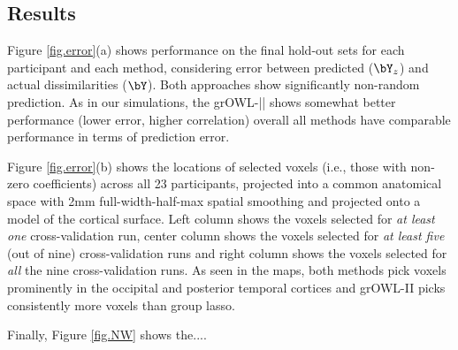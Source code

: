 \subsection{Results}

Figure \ref{fig.error}(a) shows performance on the final hold-out sets for each participant and each method, considering error between predicted ($\bY_z$) and actual dissimilarities ($\bY$). Both approaches show significantly non-random prediction. As in our simulations, the grOWL-|| shows somewhat better performance (lower error, higher correlation) overall all methods have comparable performance in terms of prediction error.

Figure \ref{fig.error}(b) shows the locations of selected voxels (i.e., those with non-zero coefficients) across all 23 participants, projected into a common anatomical space with 2mm full-width-half-max spatial smoothing and projected onto a model of the cortical surface. Left column shows the voxels selected for \textit{at least one} cross-validation run, center column shows the voxels selected for \textit{at least five} (out of nine) cross-validation runs and right column shows the voxels selected for \textit{all} the nine cross-validation runs. As seen in the maps, both methods pick voxels prominently in the occipital and posterior temporal cortices and grOWL-II picks consistently more voxels than group lasso.

Finally, Figure \ref{fig.NW} shows the....

\begin{figure*}[!t]
\centering
{}
\hfil
{}
\caption{Panel (a) shows mean hold-out prediction error for group lasso and grOWLs for 23 subjects. Panel (b) shows surface maps corresponding to group lasso (top), grOWL-I (middle) and grOWL-II (bottom) showing the voxels selected for \textit{at least one}, \textit{at least five} and \textit{all nine} cross-validations in the left, center and right columns respectively. The heat map shows the number of subjects for which those voxels were picked. Blue is the least (1 subject) and red is the most (17 subjects).}
\label{fig.error}
\end{figure*}

